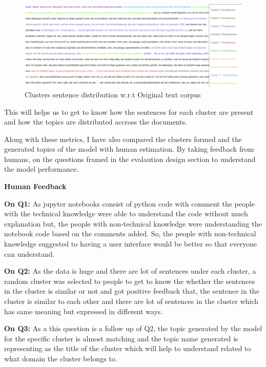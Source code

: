 \begin{figure}[htbp]
    \begin{center}
      \includegraphics[width=12cm]{./Images/cluster_legends.png}
       \caption{Clusters sentence distribution w.r.t Original text corpus}
       \label{fig: Clusters sentence distribution w.r.t Original text corpus}
    \end{center}
\end{figure}

This will helps us to get to know how the sentences for each cluster are present and how the topics are distributed accross the documents.

\noindent Along with these metrics, I have also compared the clusters formed and the generated topics of the model with human estimation.
By taking feedback from humans, on the questions framed in the evalaution design section to understand the model performance.
\vspace{3cm}

\noindent\textbf{Human Feedback}

\noindent\textbf{On Q1:} As jupyter notebooks consist of python code with comment the people with the technical knowledge were able to understand the code without much explanation but, the people with 
non-technical knowledge were understanding the notebook code based on the comments added. So, the people with non-technical knowledge suggested to having a user interface would be better 
so that everyone can understand.

\noindent\textbf{On Q2:} As the data is huge and there are lot of sentences under each cluster, a random cluster was selected to people to get to know the whether the sentences in the cluster is similar or not 
and got positive feedback that, the sentence in the cluster is similar to each other and there are lot of sentences in the cluster which has same meaning but expressed in different ways.

\noindent\textbf{On Q3:} As a this question is a follow up of Q2, the topic generated by the model for the specific cluster is almost matching and the topic name generated is representing as the title of the cluster 
which will help to understand related to what domain the cluster belongs to.

